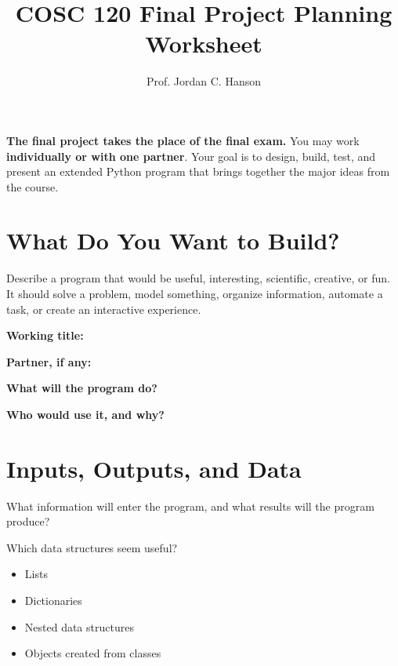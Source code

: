 \documentclass{article}
\begin{document}
\twocolumn

\title{COSC 120 Final Project Planning Worksheet}
\author{Prof. Jordan C. Hanson}
\date{}

\maketitle

\noindent
\textbf{The final project takes the place of the final exam.}
You may work \textbf{individually or with one partner}. Your goal is
to design, build, test, and present an extended Python program that
brings together the major ideas from the course.

\section{What Do You Want to Build?}

Describe a program that would be useful, interesting, scientific,
creative, or fun. It should solve a problem, model something, organize
information, automate a task, or create an interactive experience. \\ \vspace{0.25cm}

\textbf{Working title:}
\underline{\hspace{5.2cm}}

\textbf{Partner, if any:}
\underline{\hspace{4.7cm}}

\textbf{What will the program do?}

\vspace{0.75cm}

\textbf{Who would use it, and why?}

\vspace{0.65cm}

\section{Inputs, Outputs, and Data}

What information will enter the program, and what results will the program produce? \\ \vspace{2cm}

Which data structures seem useful?

\begin{itemize}
\item[$\square$] Lists
\item[$\square$] Dictionaries
\item[$\square$] Nested data structures
\item[$\square$] Objects created from classes
\end{itemize}
\end{document}
